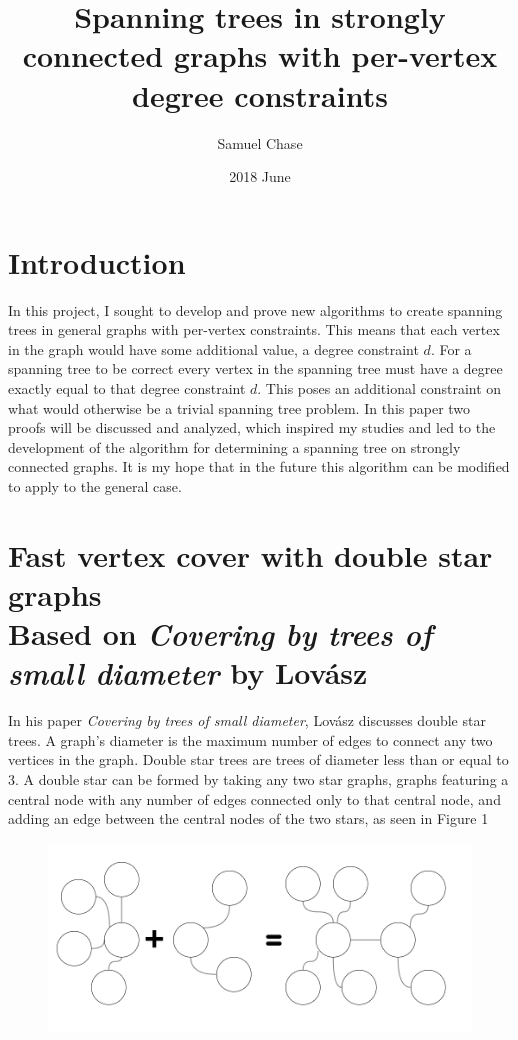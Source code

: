 \documentclass{article}
\title{Spanning trees in strongly connected graphs with per-vertex degree constraints}
\date{2018 June}
\author{Samuel Chase}
\begin{document}
	\maketitle
	\section{Introduction}
	In this project, I sought to develop and prove new algorithms to create spanning trees in general graphs with per-vertex constraints. 
	This means that each vertex in the graph would have some additional value, a degree constraint $d$. For a spanning tree to be correct every vertex in the spanning tree must have a degree exactly equal to that degree constraint $d$. This poses an additional constraint on what
	would otherwise be a trivial spanning tree problem. In this paper two proofs will be discussed and analyzed, which inspired my studies and led to the development of the algorithm for determining a spanning tree on strongly connected graphs. It is my hope that in the future this algorithm can be modified to apply to the general case.
	
	
	
	\section{Fast vertex cover with double star graphs \\ {\large Based on \textit{Covering by trees of small diameter} by Lov\'asz}}
	In his paper \textit{Covering by trees of small diameter}, Lov\'asz discusses double star trees. A graph's diameter is the maximum number of edges to connect any two vertices in the graph. Double star trees are trees of diameter less than or equal to 3. A double star can be formed by taking any two star graphs, graphs featuring a central node with any number of edges connected only to that central node, and adding an edge between the central nodes of the two stars, as seen in Figure 1
	\begin{figure}[H]
		\caption{}
		\includegraphics{Figure1}
	\end{figure}
	
\end{document}
